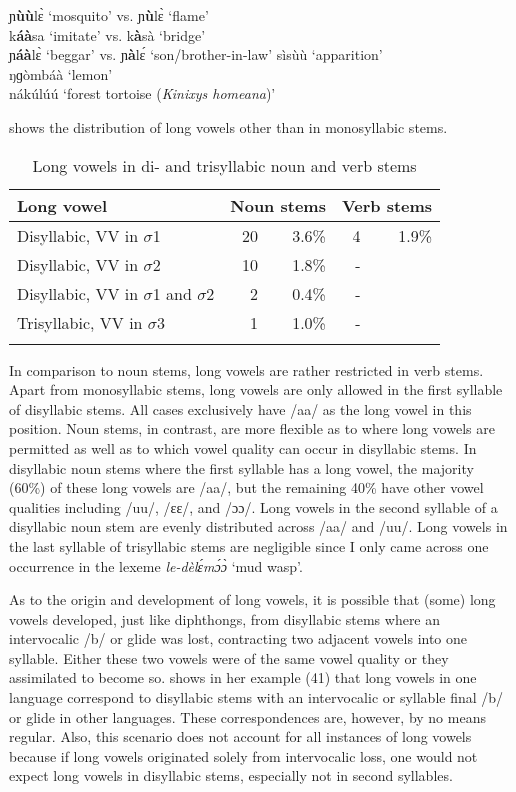\ea \label{LongV2}
ɲ{\bfseries ùù}lɛ̀ `mosquito' vs. ɲ{\bfseries ù}lɛ̀ `flame' \\
k{\bfseries áà}sa `imitate' vs. k{\bfseries à}sà `bridge' \\
ɲ{\bfseries áà}lɛ̀ `beggar' vs. ɲ{\bfseries à}lɛ́ `son/brother-in-law'
\ex \label{LongV3}
sìsùù `apparition' \\
ŋɡòmbáà `lemon' \\
nákúlúú `forest tortoise ({\itshape Kinixys homeana})'
\z

 \noindent {} shows the distribution of long vowels other than in monosyllabic stems.

\begin{table}
\begin{tabularx}{\textwidth}{X rrrr}
\lsptoprule
Long vowel& \multicolumn{2}{c}{Noun stems   } & \multicolumn{2}{c}{Verb stems  } \\  \midrule
Disyllabic, VV in $\sigma$1 & 20 & 3.6\% & 4 & 1.9\%\\
Disyllabic, VV in $\sigma$2 & 10 & 1.8\% & - \\
Disyllabic, VV in $\sigma$1 and $\sigma$2 & 2 & 0.4\% & - \\
Trisyllabic, VV in $\sigma$3 & 1 & 1.0\% & - \\
\lspbottomrule
\end{tabularx}
\caption{Long vowels in di- and trisyllabic noun and verb stems}
\label{Tab:VLength2}
\end{table}

In comparison to noun stems, long vowels are rather restricted in verb stems. Apart from monosyllabic stems,  long vowels are only allowed in the first syllable of disyllabic stems. All cases exclusively have /aa/ as the long vowel in this position. Noun stems, in contrast, are more flexible as to where long vowels are permitted as well as to which vowel quality can occur in disyllabic stems. In disyllabic noun stems where the first syllable has a long vowel, the majority (60\%) of these long vowels are /aa/, but the remaining 40\% have other vowel qualities including /uu/, /ɛɛ/, and /ɔɔ/. Long vowels in the second syllable of a disyllabic noun stem are evenly distributed across /aa/ and /uu/. Long vowels in the last syllable of trisyllabic stems are negligible since I only came across one occurrence in the lexeme {\itshape le-dèlɛ́mɔ́ɔ̀} `mud wasp'.

As to the origin and development of long vowels, it is possible that (some) long vowels developed, just like diphthongs, from disyllabic stems where an intervocalic /b/ or glide was lost, contracting two adjacent vowels into one syllable. Either these two vowels were of the same vowel quality or they assimilated to become so. \citet[328]{cheucle2014} shows in her example (41) that long vowels in one language correspond to disyllabic stems with an intervocalic or syllable final /b/ or glide in other languages. These correspondences are, however, by no means regular.
Also, this scenario does not account for all instances of long vowels because if long vowels originated solely from intervocalic loss, one would not expect long vowels in disyllabic stems, especially not in second syllables.

